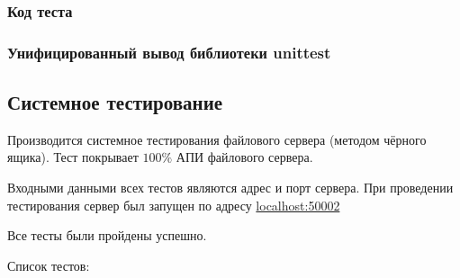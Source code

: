 \documentclass[a4paper,12pt]{report}
\numberwithin{equation}{section}
\begin{document}
\subsubsection{Код теста}


\subsubsection{Унифицированный вывод библиотеки unittest}



\subsection{Системное тестирование}
Производится системное тестирования файлового сервера (методом чёрного ящика).
Тест покрывает $100\%$ АПИ файлового сервера.

Входными данными всех тестов являются адрес и порт сервера.
При проведении тестирования сервер был запущен по адресу \url{localhost:50002}

Все тесты были пройдены успешно.

Список тестов:
\end{document}
